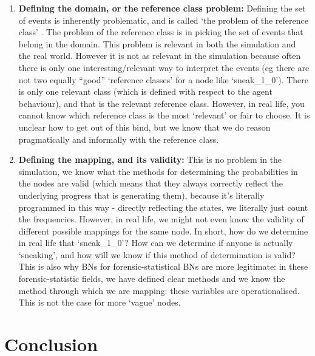 \documentclass[12pt]{article}
\begin{document}
\begin{enumerate}
\begin{enumerate}
\item \textbf{Defining the domain, or the reference class problem:} Defining the set of events is inherently problematic, and is called `the problem of the reference class' \citep{colyvan2001}. The problem of the reference class is in picking the set of events that belong in the domain. This problem is relevant in both the simulation and the real world.  However it is not as relevant in the simulation because often there is only one interesting/relevant way to interpret the events (eg there are not two equally ``good'' `reference classes' for a node like `sneak\_1\_0'). There is only one relevant class (which is defined with respect to the agent behaviour), and that is the relevant reference class. However, in real life, you cannot know which reference class is the most `relevant' or fair to choose. It is unclear how to get out of this bind, but we know that we do reason pragmatically and informally with the reference class.
\item \textbf{Defining the mapping, and its validity:} This is no problem in the simulation, we know what the methods for determining the probabilities in the nodes are valid (which means that they always correctly reflect the underlying progress that is generating them), because it's literally programmed in this way - directly reflecting the states, we literally just count the frequencies. However, in real life, we might not even know the validity of different possible mappings for the same node. In short, how do we determine in real life that `sneak\_1\_0'? How can we determine if anyone is actually `sneaking', and how will we know if this method of determination is valid? This is also why BNs for forensic-statistical BNs are more legitimate: in these forensic-statistic fields, we have defined clear methods and we know the method through which we are mapping: these variables are operationalised. This is not the case for more `vague' nodes.
\end{enumerate}
\end{enumerate}




\section{Conclusion}
\end{document}
